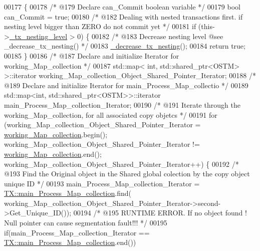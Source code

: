 \begin{DoxyCode}
00177                 \{
00178     \textcolor{comment}{/* @179 Declare can\_Commit boolean variable */}
00179     \textcolor{keywordtype}{bool} can\_Commit = \textcolor{keyword}{true};
00180     \textcolor{comment}{/* @182 Dealing with nested transactions first. if nesting level bigger than ZERO do not commit yet */}
00181     \textcolor{keywordflow}{if} (this->\hyperlink{class_t_x_ae8f413fd7f4fea322e7ad3c668f9898e_ae8f413fd7f4fea322e7ad3c668f9898e}{\_tx\_nesting\_level} > 0) \{
00182         \textcolor{comment}{/* @183 Decrease nesting level @see \_decrease\_tx\_nesting() */}
00183         \hyperlink{class_t_x_aa3ac499f576326588628ade96b27b4b1_aa3ac499f576326588628ade96b27b4b1}{\_decrease\_tx\_nesting}();
00184         \textcolor{keywordflow}{return} \textcolor{keyword}{true};
00185     \} 
00186     \textcolor{comment}{/* @187 Declare and initialize Iterator for working\_Map\_collection */}
00187     std::map< int, std::shared\_ptr<OSTM> >::iterator working\_Map\_collection\_Object\_Shared\_Pointer\_Iterator;
00188     \textcolor{comment}{/* @189 Declare and initialize Iterator for main\_Process\_Map\_collectio */}
00189     std::map<int, std::shared\_ptr<OSTM>>::iterator main\_Process\_Map\_collection\_Iterator;
00190     \textcolor{comment}{/* @191 Iterate through the working\_Map\_collection, for all associated copy objetcs */}
00191     \textcolor{keywordflow}{for} (working\_Map\_collection\_Object\_Shared\_Pointer\_Iterator = 
      \hyperlink{class_t_x_a81aafda16e2f20e36ec6c68e584668ff_a81aafda16e2f20e36ec6c68e584668ff}{working\_Map\_collection}.begin(); working\_Map\_collection\_Object\_Shared\_Pointer\_Iterator
       != \hyperlink{class_t_x_a81aafda16e2f20e36ec6c68e584668ff_a81aafda16e2f20e36ec6c68e584668ff}{working\_Map\_collection}.end(); 
      working\_Map\_collection\_Object\_Shared\_Pointer\_Iterator++) \{
00192             \textcolor{comment}{/* @193 Find the Original object in the Shared global colection by the copy object unique ID */}
00193             main\_Process\_Map\_collection\_Iterator = 
      \hyperlink{class_t_x_a1a45d726894190695314464d7cd97c29_a1a45d726894190695314464d7cd97c29}{TX::main\_Process\_Map\_collection}.find(
      working\_Map\_collection\_Object\_Shared\_Pointer\_Iterator->second->Get\_Unique\_ID());
00194             \textcolor{comment}{/* @195 RUNTIME ERROR. If no object found ! Null pointer can cause segmentation fault!!! */}
00195             \textcolor{keywordflow}{if}(main\_Process\_Map\_collection\_Iterator == 
      \hyperlink{class_t_x_a1a45d726894190695314464d7cd97c29_a1a45d726894190695314464d7cd97c29}{TX::main\_Process\_Map\_collection}.end())

\end{DoxyCode}
